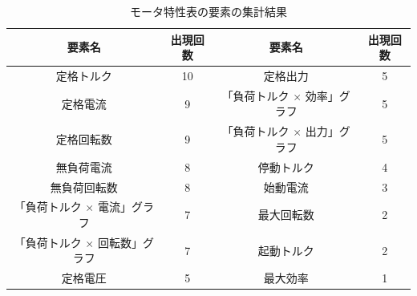 \begin{table}[t]
	\centering
	\caption{モータ特性表の要素の集計結果}
	\begin{tabular}{|c|c||c|c|} \hline
		要素名 & 出現回数 & 要素名 & 出現回数 \\ \hline\hline
		定格トルク & 10 & 定格出力 & 5 \\ \hline
		定格電流 & 9 & 「負荷トルク $\times$ 効率」グラフ & 5 \\ \hline
		定格回転数 & 9 & 「負荷トルク $\times$ 出力」グラフ & 5 \\ \hline
		無負荷電流 & 8 & 停動トルク & 4 \\ \hline
		無負荷回転数 & 8  & 始動電流 & 3 \\ \hline
		「負荷トルク $\times$ 電流」グラフ & 7 &  最大回転数 & 2 \\ \hline
		「負荷トルク $\times$ 回転数」グラフ & 7 & 起動トルク & 2\\ \hline
		定格電圧 & 5 & 最大効率 & 1 \\ \hline
		
		
	\end{tabular}
	 \label{tab:syuukei}
  \end{table}

